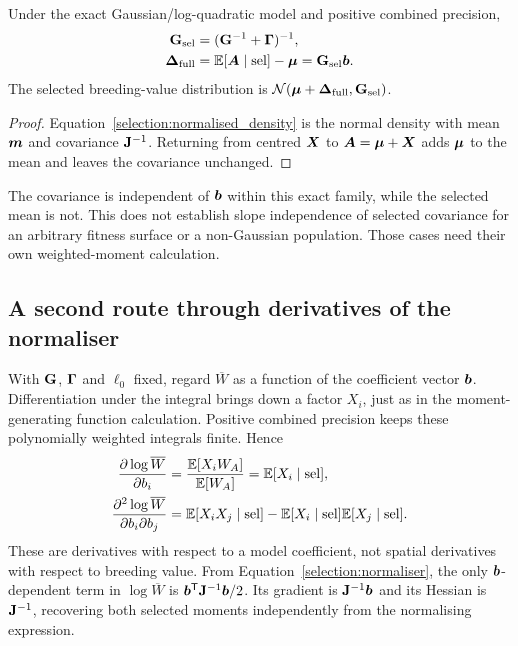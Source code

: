 \begin{proposition}
\label{selection:selected_moments}
Under the exact Gaussian/log-quadratic model and positive combined
precision,
\begin{align}
\mathbf{G}_{\mathrm{sel}}&=(\mathbf{G}^{-1}+\boldsymbol{\Gamma})^{-1},\nonumber\\
\boldsymbol{\Delta}_{\mathrm{full}}
 &=\mathbb E[\boldsymbol{A}\mid\mathrm{sel}]-\boldsymbol{\mu}
   =\mathbf{G}_{\mathrm{sel}}\boldsymbol{b}.
\label{selection:moment_formulas}
\end{align}
The selected breeding-value distribution is
$\mathcal N(\boldsymbol{\mu}+\boldsymbol{\Delta}_{\mathrm{full}},\mathbf{G}_{\mathrm{sel}})$.
\end{proposition}
\begin{proof}
Equation~\eqref{selection:normalised_density} is the normal density with
mean $\boldsymbol{m}$ and covariance $\mathbf{J}^{-1}$. Returning from centred
$\boldsymbol{X}$ to $\boldsymbol{A}=\boldsymbol{\mu}+\boldsymbol{X}$ adds $\boldsymbol{\mu}$ to the mean
and leaves the covariance unchanged.
\end{proof}

The covariance is independent of $\boldsymbol{b}$ within this exact family, while
the selected mean is not. This does not establish slope independence of
selected covariance for an arbitrary fitness surface or a non-Gaussian
population. Those cases need their own weighted-moment calculation.

\subsection{A second route through derivatives of the normaliser}
\label{selection:normaliser_derivatives}

With $\mathbf{G}$, $\boldsymbol{\Gamma}$ and $\ell_0$ fixed, regard $\overline W$ as a
function of the coefficient vector $\boldsymbol{b}$. Differentiation under the
integral brings down a factor $X_i$, just as in the moment-generating
function calculation. Positive combined precision keeps these polynomially
weighted integrals finite. Hence
\begin{align}
\frac{\partial\log\overline W}{\partial b_i}
 &=\frac{\mathbb E[X_iW_A]}{\mathbb E[W_A]}
   =\mathbb E[X_i\mid\mathrm{sel}],\nonumber\\
\frac{\partial^2\log\overline W}{\partial b_i\partial b_j}
 &=\mathbb E[X_iX_j\mid\mathrm{sel}]
    -\mathbb E[X_i\mid\mathrm{sel}]\mathbb E[X_j\mid\mathrm{sel}].
\label{selection:derivative_moments}
\end{align}
These are derivatives with respect to a model coefficient, not spatial
derivatives with respect to breeding value. From
Equation~\eqref{selection:normaliser}, the only $\boldsymbol{b}$-dependent
term in $\log\overline W$ is
$\boldsymbol{b}^{\mathsf T}\mathbf{J}^{-1}\boldsymbol{b}/2$. Its gradient is
$\mathbf{J}^{-1}\boldsymbol{b}$ and its Hessian is $\mathbf{J}^{-1}$, recovering
both selected moments independently from the normalising expression.

